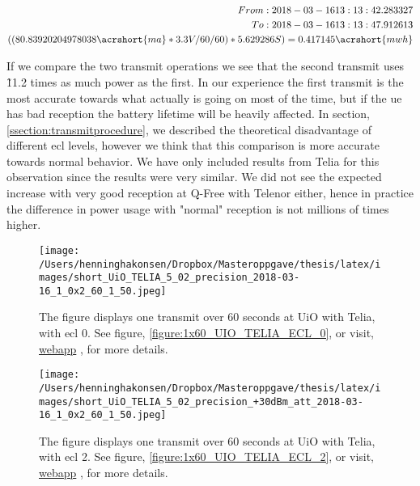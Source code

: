 \documentclass[USenglish]{ifimaster}  %
\begin{document}
\begin{equation} \label{equation:ecl2}
\begin{aligned}
From: 2018-03-16 13:13:42.283327 \\
To: 2018-03-16 13:13:47.912613 \\
((80.83920204978038\acrshort{ma} * 3.3V / 60 / 60 ) * 5.629286S) = 0.417145\acrshort{mwh} \\
\end{aligned}
\end{equation}

If we compare the two transmit operations we see that the second transmit uses \~ 11.2 times as much power as the first. In our experience the first transmit is the most accurate towards what actually is going on most of the time, but if the \acrshort{ue} has bad reception the battery lifetime will be heavily affected. In section, \vref{ssection:transmitprocedure}, we described the theoretical disadvantage of different \acrshort{ecl} levels, however we think that this comparison is more accurate towards normal behavior. We have only included results from Telia for this observation since the results were very similar. We did not see the expected increase with very good reception at Q-Free with Telenor either, hence in practice the difference in power usage with "normal" reception is not millions of times higher.

\begin{figure}[H]
  \centering
  \texttt{[image: /Users/henninghakonsen/Dropbox/Masteroppgave/thesis/latex/images/short\_UiO\_TELIA\_5\_02\_precision\_2018-03-16\_1\_0x2\_60\_1\_50.jpeg]}
  \caption[Short-term test - \acrshort{ecl} 0]{The figure displays one transmit over 60 seconds at UiO with Telia, with \acrshort{ecl} 0. See figure, \vref{figure:1x60_UIO_TELIA_ECL_0}, or visit, \href{http://158.39.77.97:9000/\#/results/UiO\_TELIA\_5.02\_precision\_2018-03-16\_1\_0x2\_60\_1\_50}{webapp} \cite{online:result5}, for more details.}
  \label{figure:1x60_UIO_TELIA_ECL_0_SHORT}
\end{figure}

\begin{figure}[H]
  \centering
  \texttt{[image: /Users/henninghakonsen/Dropbox/Masteroppgave/thesis/latex/images/short\_UiO\_TELIA\_5\_02\_precision\_+30dBm\_att\_2018-03-16\_1\_0x2\_60\_1\_50.jpeg]}
  \caption[Short-term test - \acrshort{ecl} 2]{The figure displays one transmit over 60 seconds at UiO with Telia, with \acrshort{ecl} 2. See figure, \vref{figure:1x60_UIO_TELIA_ECL_2}, or visit, \href{http://158.39.77.97:9000/\#/results/UiO\_TELIA\_5.02\_precision\_+30dBm\_att\_2018-03-16\_1\_0x2\_60\_1\_50}{webapp} \cite{online:result6}, for more details.}
  \label{figure:1x60_UIO_TELIA_ECL_2_SHORT}
\end{figure}
\end{document}
